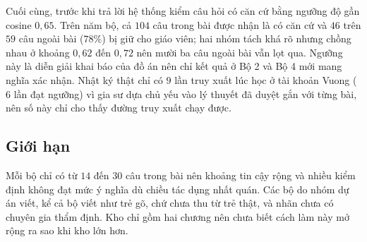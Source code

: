 

Cuối cùng, trước khi trả lời hệ thống kiểm câu hỏi có căn cứ bằng ngưỡng độ gần cosine $0{,}65$. Trên năm bộ, cả $104$ câu trong bài được nhận là có căn cứ và $46$ trên $59$ câu ngoài bài ($78\%$) bị giữ cho giáo viên; hai nhóm tách khá rõ nhưng chồng nhau ở khoảng $0{,}62$ đến $0{,}72$ nên mười ba câu ngoài bài vẫn lọt qua. Ngưỡng này là diễn giải khai báo của đồ án nên chỉ kết quả ở Bộ 2 và Bộ 4 mới mang nghĩa xác nhận. Nhật ký thật chỉ có $9$ lần truy xuất lúc học ở tài khoản Vuong ($6$ lần đạt ngưỡng) vì gia sư dựa chủ yếu vào lý thuyết đã duyệt gắn với từng bài, nên số này chỉ cho thấy đường truy xuất chạy được.

\subsection{Giới hạn}
Mỗi bộ chỉ có từ $14$ đến $30$ câu trong bài nên khoảng tin cậy rộng và nhiều kiểm định không đạt mức ý nghĩa dù chiều tác dụng nhất quán. Các bộ do nhóm dự án viết, kể cả bộ viết như trẻ gõ, chứ chưa thu từ trẻ thật, và nhãn chưa có chuyên gia thẩm định. Kho chỉ gồm hai chương nên chưa biết cách làm này mở rộng ra sao khi kho lớn hơn.
